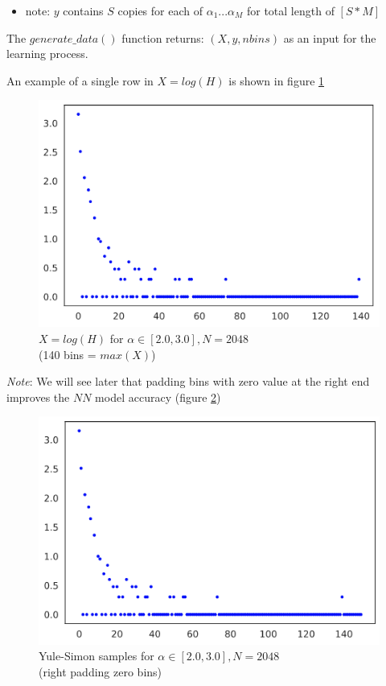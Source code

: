 \documentclass[a4paper, 12pt]{report}
\begin{document}
\begin{itemize}
  \item note: $y$ contains $S$ copies for each of $\alpha_1...\alpha_M$ for total length of $[S*M]$
\end{itemize}

The $generate\_data()$ function returns: $(X, y, nbins)$ as an input for the learning process.

\newpage
\par An example of a single row in $X = log(H)$ is shown in figure  \ref{fig:yule-simon-log-scale}

\begin{figure}[h]
\centering
\includegraphics[width=0.7\linewidth]{./dataset}
\caption[Yule-Simon log-scale]{$X = log(H)$ for $\alpha\in[2.0,3.0], N=2048$ \\(140 bins = $max(X)$)}
\label{fig:yule-simon-log-scale}
\end{figure}

\textit{Note}: We will see later that padding bins with zero value at the right end improves the $NN$ model accuracy (figure  \ref{fig:yule-simon-log-scale-zeros-padding})

\begin{figure}[h]
\centering
\includegraphics[width=0.7\linewidth]{./dataset-zeros}
\caption[Yule-Simon log-scale with zero padding]{Yule-Simon samples for $\alpha\in[2.0,3.0], N=2048$ \\(right padding zero bins)}
\label{fig:yule-simon-log-scale-zeros-padding}
\end{figure}
\end{document}
